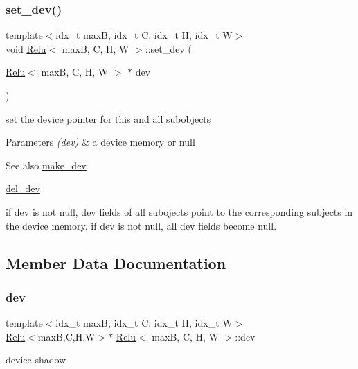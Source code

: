 \subsubsection{\texorpdfstring{set\+\_\+dev()}{set\_dev()}}
{\footnotesize\ttfamily template$<$idx\+\_\+t maxB, idx\+\_\+t C, idx\+\_\+t H, idx\+\_\+t W$>$ \\
void \hyperlink{structRelu}{Relu}$<$ maxB, C, H, W $>$\+::set\+\_\+dev (\begin{DoxyParamCaption}\item[{\hyperlink{structRelu}{Relu}$<$ maxB, C, H, W $>$ $\ast$}]{dev }\end{DoxyParamCaption})\hspace{0.3cm}{\ttfamily [inline]}}



set the device pointer for this and all subobjects 


\begin{DoxyParams}{Parameters}
{\em (dev)} & a device memory or null \\
\hline
\end{DoxyParams}
\begin{DoxySeeAlso}{See also}
\hyperlink{structRelu_a0109665896b86defceb3b7b5f4869075}{make\+\_\+dev} 

\hyperlink{structRelu_a449f220c5cd23217aa463f68a8a4933a}{del\+\_\+dev}
\end{DoxySeeAlso}
if dev is not null, dev fields of all subojects point to the corresponding subjects in the device memory. if dev is not null, all dev fields become null. 

\subsection{Member Data Documentation}
\mbox{\label{structRelu_a1e1271caca013c95ece064b47196d100}} 
\subsubsection{\texorpdfstring{dev}{dev}}
{\footnotesize\ttfamily template$<$idx\+\_\+t maxB, idx\+\_\+t C, idx\+\_\+t H, idx\+\_\+t W$>$ \\
\hyperlink{structRelu}{Relu}$<$maxB,C,H,W$>$$\ast$ \hyperlink{structRelu}{Relu}$<$ maxB, C, H, W $>$\+::dev}

device shadow \mbox{\label{structRelu_a0e864208d70a5d7976a71c87a54c7edf}} 
